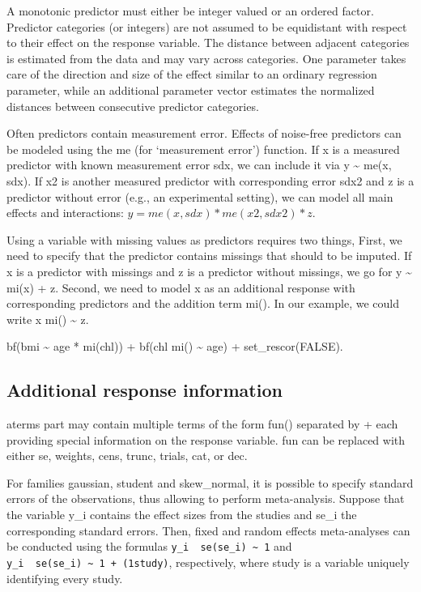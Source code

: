 \documentclass[]{book}
\begin{document}
A monotonic predictor must either be integer valued or an ordered
factor. Predictor categories (or integers) are not assumed to be
equidistant with respect to their effect on the response variable. The
distance between adjacent categories is estimated from the data and may
vary across categories. One parameter takes care of the direction and
size of the effect similar to an ordinary regression parameter, while an
additional parameter vector estimates the normalized distances between
consecutive predictor categories.

Often predictors contain measurement error. Effects of noise-free
predictors can be modeled using the me (for `measurement error')
function. If x is a measured predictor with known measurement error sdx,
we can include it via y \textasciitilde{} me(x, sdx). If x2 is another
measured predictor with corresponding error sdx2 and z is a predictor
without error (e.g., an experimental setting), we can model all main
effects and interactions: \(y = me(x, sdx) * me(x2, sdx2) * z\).

Using a variable with missing values as predictors requires two things,
First, we need to specify that the predictor contains missings that
should to be imputed. If x is a predictor with missings and z is a
predictor without missings, we go for y \textasciitilde{} mi(x) + z.
Second, we need to model x as an additional response with corresponding
predictors and the addition term mi(). In our example, we could write x
\textbar{} mi() \textasciitilde{} z.

bf(bmi \textasciitilde{} age * mi(chl)) + bf(chl \textbar{} mi()
\textasciitilde{} age) + set\_rescor(FALSE).

\subsection{Additional response
information}\label{additional-response-information}

aterms part may contain multiple terms of the form fun() separated by +
each providing special information on the response variable. fun can be
replaced with either se, weights, cens, trunc, trials, cat, or dec.

For families gaussian, student and skew\_normal, it is possible to
specify standard errors of the observations, thus allowing to perform
meta-analysis. Suppose that the variable y\_i contains the effect sizes
from the studies and se\_i the corresponding standard errors. Then,
fixed and random effects meta-analyses can be conducted using the
formulas \texttt{y\_i\ \textbar{}\ se(se\_i)\ \textasciitilde{}\ 1} and
\texttt{y\_i\ \textbar{}\ se(se\_i)\ \textasciitilde{}\ 1\ +\ (1\textbar{}study)},
respectively, where study is a variable uniquely identifying every
study.
\end{document}
